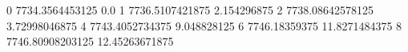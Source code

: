 0 7734.3564453125 0.0
1 7736.5107421875 2.154296875
2 7738.08642578125 3.72998046875
4 7743.4052734375 9.048828125
6 7746.18359375 11.8271484375
8 7746.80908203125 12.45263671875

